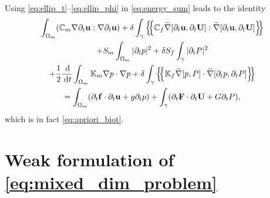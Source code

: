\documentclass[a4paper]{article}
\numberwithin{equation}{section}
\def\agrad{\widetilde\nabla}
\def\avg#1{\left\{\mskip-5mu\left\{#1\right\}\mskip-5mu\right\}}
\def\CC{\tn C}
\def\d {\,{\rm d}}
\def\ddt#1{\frac{\d #1}{\d t}}
\def\dt{\prtl_t}
\def\FF{\vc F}
\def\ff{\vc f}
\def\jmp#1{\left\llbracket #1 \right\rrbracket}
\def\nnu{\boldsymbol\nu}
\def\prtl{\partial}
\def\tn#1{{\mathbb{#1}}}    %
\def\U{\vc U}
\def\uu{\vc u}
\def\vc#1{\mathbf{#1}}     %
\newcommand{\mls}[1]{\begin{multline*}#1\end{multline*}}
\begin{document}
Using \eqref{eq:ellip_t}--\eqref{eq:ellip_phi} in \eqref{eq:energy_sum} leads to the identity
\mls{ \int_{\Omega_m}(\CC_m\nabla\dt\uu:\nabla\dt\uu ) + \delta\int_\gamma\avg{\CC_f\agrad[\dt\uu,\dt\U]:\agrad[\dt\uu,\dt\U]}\\
+ S_m\int_{\Omega_m}|\dt p|^2 + \delta S_f\int_\gamma|\dt P|^2\\
+ \frac12\ddt{}\int_{\Omega_m}\tn K_m\nabla p\cdot\nabla p
+ \delta\int_\gamma\avg{\tn K_f\agrad[p,P]\cdot\agrad[\dt p,\dt P]} \\
= \int_{\Omega_m}(\dt\ff\cdot\dt\uu + g \dt p) + \int_\gamma(\dt\FF\cdot\dt\U + G \dt P), }
which is in fact \eqref{eq:apriori_biot}.



\section{Weak formulation of \eqref{eq:mixed_dim_problem}}\label{sec:app_weak_form}
\end{document}
